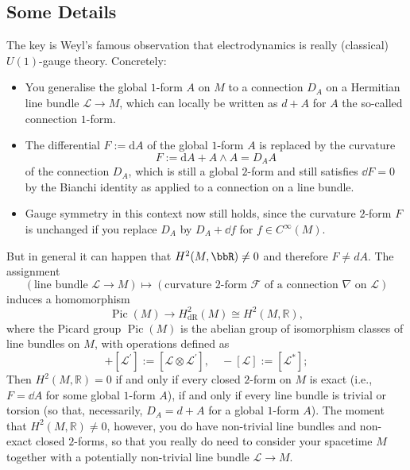 \subsection{Some Details}
The key is Weyl's famous observation that electrodynamics is really (classical) $U(1)$-gauge theory. Concretely: 
\begin{itemize}
    \item You generalise the global $1$-form $A$ on $M$ to a connection $D_A$ on a Hermitian line bundle $\mathcal{L} \to M$, which can locally be written as $d + A$ for $A$ the so-called connection $1$-form.
    \item The differential $F := \mathrm{d}A$ of the global $1$-form $A$ is replaced by the curvature $$F := \mathrm{d}A + A \wedge A = D_A A$$ of the connection $D_A$, which is still a global $2$-form and still satisfies $\dd F = 0$ by the Bianchi identity as applied to a connection on a line bundle. 
    \item Gauge symmetry in this context now still holds, since the curvature $2$-form $F$ is unchanged if you replace $D_A$ by $D_A + \dd f$ for $f \in C^\infty(M)$.
\end{itemize}
But in general it can happen that $H^2(M,\bbR)\neq 0$ and therefore $F\neq d A$. The assignment
\begin{equation}
 (\text{line bundle $\mathcal{L} \to M$}) \mapsto (\text{curvature $2$-form $\mathcal{F}$ of a connection $\nabla$ on $\mathcal{L}$})
\end{equation}
induces a homomorphism
\begin{equation}
 \operatorname{Pic}(M) \to H^2_{\mathrm{dR}}(M) \cong H^2(M,\mathbb{R}),
\end{equation}
where the Picard group $\operatorname{Pic}(M)$ is the abelian group of isomorphism classes of line bundles on $M$, with operations defined as
\begin{equation}
 [\mathcal{L}] + [\mathcal{L}^\prime] := [\mathcal{L} \otimes \mathcal{L}^\prime], \quad -[\mathcal{L}] := [\mathcal{L}^\ast];
\end{equation}
Then $H^2(M,\mathbb{R}) = 0$ if and only if every closed $2$-form on $M$ is exact (i.e., $F = \dd A$ for some global $1$-form $A$), if and only if every line bundle is trivial or torsion (so that, necessarily, $D_A = d + A$ for a global $1$-form $A$). The moment that $H^2(M,\mathbb{R}) \neq 0$, however, you do have non-trivial line bundles and non-exact closed $2$-forms, so that you really do need to consider your spacetime $M$ together with a potentially non-trivial line bundle $\mathcal{L} \to M$.
